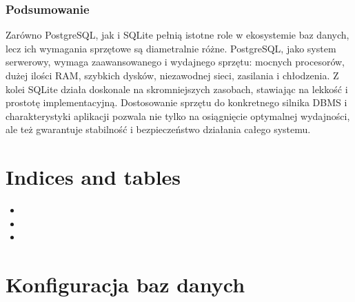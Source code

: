\documentclass[letterpaper,10pt,polish]{sphinxmanual}
\begin{document}
\subsubsection{Podsumowanie}
\label{\detokenize{rozdzial2/Sprzet-dla-bazy-danych/source/SprzetDlaBazyDanych:podsumowanie}}
\sphinxAtStartPar
Zarówno PostgreSQL, jak i SQLite pełnią istotne role w ekosystemie baz danych, lecz ich wymagania sprzętowe są diametralnie różne. PostgreSQL, jako system serwerowy, wymaga zaawansowanego i wydajnego sprzętu: mocnych procesorów, dużej ilości RAM, szybkich dysków, niezawodnej sieci, zasilania i chłodzenia.
Z kolei SQLite działa doskonale na skromniejszych zasobach, stawiając na lekkość i prostotę implementacyjną.
Dostosowanie sprzętu do konkretnego silnika DBMS i charakterystyki aplikacji pozwala nie tylko na osiągnięcie optymalnej wydajności, ale też gwarantuje stabilność i bezpieczeństwo działania całego systemu.


\section{Indices and tables}
\label{\detokenize{rozdzial2/Sprzet-dla-bazy-danych/source/index:indices-and-tables}}\begin{itemize}
\item {} 
\sphinxAtStartPar
{}

\item {} 
\sphinxAtStartPar
{}

\item {} 
\sphinxAtStartPar
{}

\end{itemize}

\sphinxstepscope


\section{Konfiguracja baz danych}
\label{\detokenize{rozdzial2/Konfiguracja_baz_danych/index:konfiguracja-baz-danych}}\label{\detokenize{rozdzial2/Konfiguracja_baz_danych/index::doc}}
\sphinxstepscope
\end{document}
